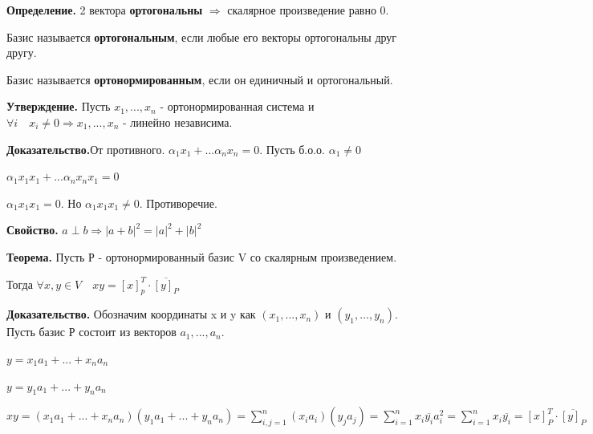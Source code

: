 \documentclass[a4paper]{article}
\begin{document}
    \newpage \begin{center}
                 \begin{Large}
                 \end{Large}
    \end{center}

    \textbf{Определение.} 2 вектора \textbf{ортогональны} $\Rightarrow$ скалярное произведение равно 0.

    Базис называется \textbf{ортогональным}, если любые его векторы ортогональны друг другу.

    Базис называется \textbf{ортонормированным}, если он единичный и ортогональный.

    \begin{htheorem}
        \textbf{Утверждение.} Пусть $x_1, ..., x_n$ - ортонормированная система и $\forall i \quad x_i \neq 0 \Rightarrow x_1, ..., x_n$ - линейно независима.
    \end{htheorem}

    \begin{hproof}
        \textbf{Доказательство.}От противного. $\alpha_1 x_1 + ... \alpha_n x_n = 0$. Пусть б.о.о. $\alpha_1 \neq 0$

        $\alpha_1 x_1 x_1 + ... \alpha_n x_n x_1 = 0$

        $\alpha_1 x_1 x_1 = 0$. Но $\alpha_1 x_1 x_1 \neq 0$. Противоречие.
    \end{hproof}


    \begin{htheorem}
        \textbf{Свойство.} $a \perp b \Rightarrow |a+b|^2 = |a|^2 + |b|^2$
    \end{htheorem}

    \begin{htheorem}
        \textbf{Теорема.} Пусть Р - ортонормированный базис V со скалярным произведением.

        Тогда $\forall x, y \in V \quad xy = [x]_p^T \cdot \overline{[y]_P}$
    \end{htheorem}

    \begin{hproof}
        \textbf{Доказательство.} Обозначим координаты x и y как $(x_1, ..., x_n)$ и $(y_1, ..., y_n)$. Пусть базис Р состоит из векторов $a_1, ..., a_n$.

        $y = x_1a_1+...+x_na_n$

        $y = y_1a_1 + ... + y_na_n$

        $\displaystyle xy = (x_1a_1+...+x_na_n)(y_1a_1 + ... + y_na_n) = \sum_{i,j=1}^n(x_ia_i)(y_ja_j) = \sum_{i=1}^n x_i \overline{y_i}a_i^2 = \sum_{i=1}^n x_i \overline{y_i} = [x]_P^T \cdot \overline{[y]_P}$
    \end{hproof}
\end{document}
